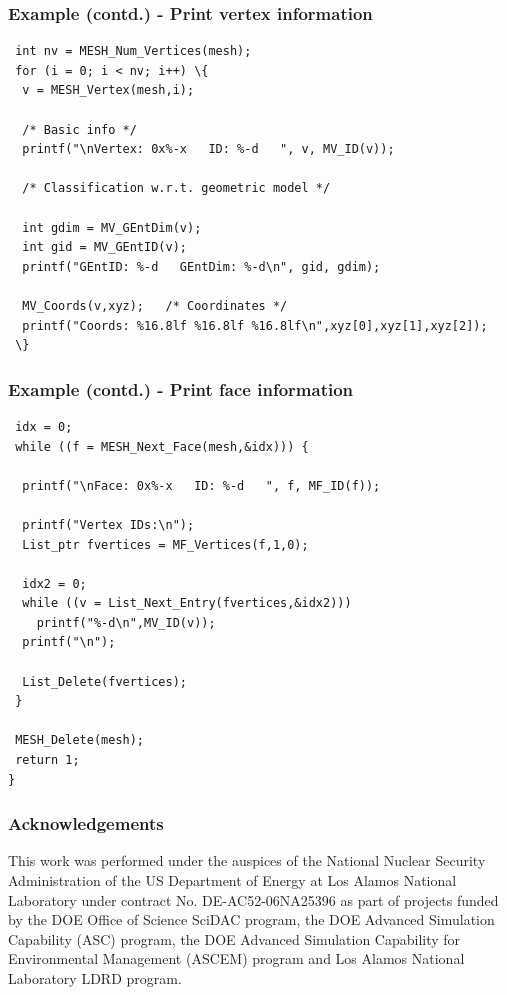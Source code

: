 \documentclass{beamer}
\begin{document}
\begin{frame}[fragile]
\frametitle{Example (contd.) - Print vertex information}

\begin{verbatim}
 int nv = MESH_Num_Vertices(mesh);
 for (i = 0; i < nv; i++) \{
  v = MESH_Vertex(mesh,i);

  /* Basic info */
  printf("\nVertex: 0x%-x   ID: %-d   ", v, MV_ID(v));
  
  /* Classification w.r.t. geometric model */
    
  int gdim = MV_GEntDim(v);
  int gid = MV_GEntID(v);
  printf("GEntID: %-d   GEntDim: %-d\n", gid, gdim);

  MV_Coords(v,xyz);   /* Coordinates */
  printf("Coords: %16.8lf %16.8lf %16.8lf\n",xyz[0],xyz[1],xyz[2]);
 \}
\end{verbatim}
\end{frame}

\begin{frame}[fragile]
\frametitle{Example (contd.) - Print face information}

\begin{verbatim}
 idx = 0;
 while ((f = MESH_Next_Face(mesh,&idx))) {

  printf("\nFace: 0x%-x   ID: %-d   ", f, MF_ID(f)); 
  
  printf("Vertex IDs:\n");
  List_ptr fvertices = MF_Vertices(f,1,0);

  idx2 = 0;
  while ((v = List_Next_Entry(fvertices,&idx2)))
    printf("%-d\n",MV_ID(v));
  printf("\n");

  List_Delete(fvertices);
 }

 MESH_Delete(mesh);
 return 1;
}
\end{verbatim}
\end{frame}

\begin{frame}
\frametitle{Acknowledgements}

This work was performed under the auspices of the National Nuclear
Security Administration of the US Department of Energy at Los Alamos
National Laboratory under contract No. DE-AC52-06NA25396 as part of
projects funded by the DOE Office of Science SciDAC program, the DOE
Advanced Simulation Capability (ASC) program, the DOE Advanced
Simulation Capability for Environmental Management (ASCEM) program and
Los Alamos National Laboratory LDRD program.

\end{frame}
\end{document}
